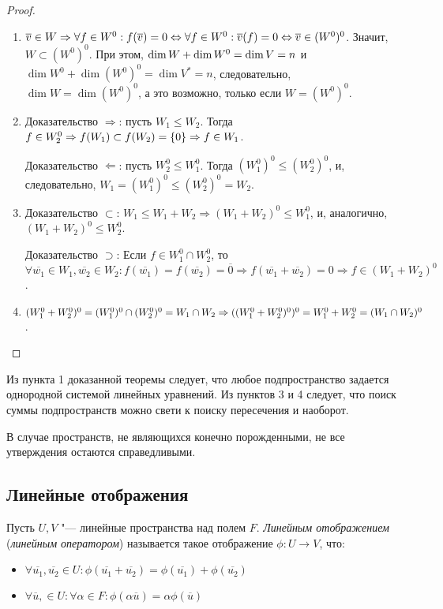 \begin{proof}~
	\begin{enumerate}
		\item $\overline{v} \in W \Rightarrow \forall f \in W^0: f(\overline{v}) = 0 \Leftrightarrow \forall f \in W^0: \overline{v}(f) = 0 \hm{\Leftrightarrow} \overline{v} \in (W^0)^0$. Значит, $W \subset (W^0)^0$. При этом, $\dim{W} + \dim{W^0} \hm{=} \dim{V} = n$ и $\dim{W^0} + \dim{(W^0)^0} = \dim{V^*} = n$, следовательно, $\dim{W} = \dim{(W^0)^0}$, а это возможно, только если $W = (W^0)^0$.
		\item Доказательство $\Rightarrow$: пусть $W_1 \le W_2$. Тогда $f \in W_2^0 \Rightarrow f(W_1) \hm{\subset} f(W_2) = \{0\} \Rightarrow f \in W_1$.
		
		Доказательство $\Leftarrow$: пусть $W_2^0 \le W_1^0$. Тогда $(W_1^0 )^0 \le (W_2^0)^0$, и, следовательно, $W_1 = (W_1^0)^0 \le (W_2^0)^0 = W_2$.
		\item Доказательство $\subset$: $W_1 \le W_1 + W_2 \Rightarrow (W_1 + W_2)^0 \le W_1^0$, и, аналогично, $(W_1 + W_2)^0 \le W_2^0$.
		
		Доказательство $\supset$: Если $f \in W_1^0 \cap W_2^0$, то $\forall \overline{w_1} \in W_1, \overline{w_2} \in W_2: f(\overline{w_1}) = f(\overline{w_2}) = \overline{0} \Rightarrow f(\overline{w_1} + \overline{w_2}) = 0 \Rightarrow f \in (W_1 + W_2)^0$.
		\item $(W_1^0 + W_2^0)^0 = (W_1^0)^0 \cap (W_2^0)^0 = W_1 \cap W_2 \Rightarrow ((W_1^0 + W_2^0)^0)^0 \hm{=} W_1^0 + W_2^0 = (W_1 \cap W_2)^0$.
	\end{enumerate}
\end{proof}

\begin{note}
	Из пункта 1 доказанной теоремы следует, что любое подпространство задается однородной системой линейных уравнений. Из пунктов 3 и 4 следует, что поиск суммы подпространств можно свети к поиску пересечения и наоборот.
\end{note}

\begin{note}
	В случае пространств, не являющихся конечно порожденными, не все утверждения остаются справедливыми.
\end{note}

\subsection{Линейные отображения}

\begin{definition}
	Пусть $U, V$ "--- линейные пространства над полем $F$. \textit{Линейным отображением} (\textit{линейным оператором}) называется такое отображение $\phi: U \rightarrow V$, что:
	\begin{itemize}
		\item $\forall \overline{u_1}, \overline{u_2} \in U: \phi(\overline{u_1} + \overline{u_2}) = \phi(\overline{u_1}) + \phi(\overline{u_2})$
		\item $\forall \overline{u}, \in U: \forall \alpha \in F: \phi(\alpha\overline{u}) = \alpha\phi(\overline{u})$
	\end{itemize}
\end{definition}

